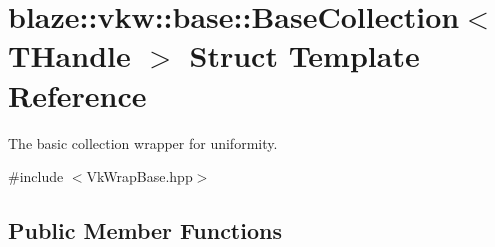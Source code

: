 \hypertarget{structblaze_1_1vkw_1_1base_1_1BaseCollection}{}\section{blaze\+:\+:vkw\+:\+:base\+:\+:Base\+Collection$<$ T\+Handle $>$ Struct Template Reference}
\label{structblaze_1_1vkw_1_1base_1_1BaseCollection}


The basic collection wrapper for uniformity.  




{\ttfamily \#include $<$Vk\+Wrap\+Base.\+hpp$>$}

\subsection*{Public Member Functions}
